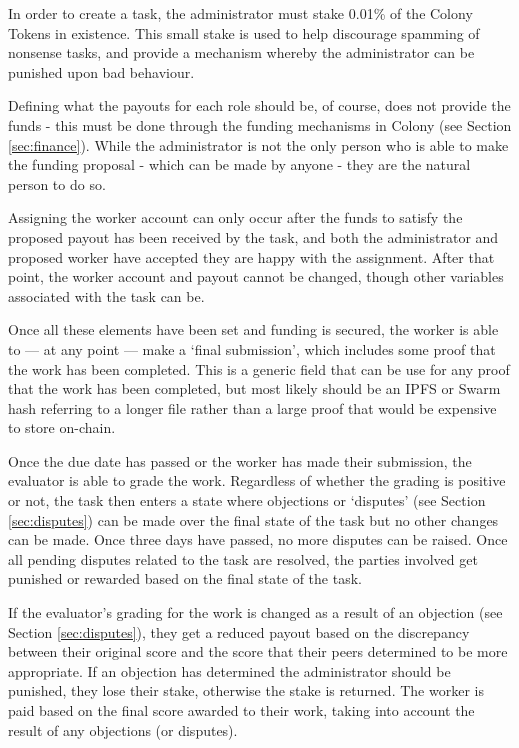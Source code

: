 In order to create a task, the administrator must stake 0.01\% of the Colony Tokens in existence. This small stake is used to help discourage spamming of nonsense tasks, and provide a mechanism whereby the administrator can be punished upon bad behaviour. 

Defining what the payouts for each role should be, of course, does not provide the funds - this must be done through the funding mechanisms in Colony (see Section \ref{sec:finance}). While the administrator is not the only person who is able to make the funding proposal - which can be made by anyone - they are the natural person to do so.

Assigning the worker account can only occur after the funds to satisfy the proposed payout has been received by the task, and both the administrator and proposed worker have accepted they are happy with the assignment. After that point, the worker account and payout cannot be changed, though other variables associated with the task can be.

Once all these elements have been set and funding is secured, the worker is able to --- at any point --- make a `final submission', which includes some proof that the work has been completed. This is a generic field that can be use for any proof that the work has been completed, but most likely should be an IPFS or Swarm hash referring to a longer file rather than a large proof that would be expensive to store on-chain.

Once the due date has passed or the worker has made their submission, the evaluator is able to grade the work. Regardless of whether the grading is positive or not, the task then enters a state where objections or `disputes' (see Section \ref{sec:disputes}) can be made over the final state of the task but no other changes can be made. Once three days have passed, no more disputes can be raised. Once all pending disputes related to the task are resolved, the parties involved get punished or rewarded based on the final state of the task.

If the evaluator's grading for the work is changed as a result of an objection (see Section \ref{sec:disputes}), they get a reduced payout based on the discrepancy between their original score and the score that their peers determined to be more appropriate. If an objection has determined the administrator should be punished, they lose their stake, otherwise the stake is returned. The worker is paid based on the final score awarded to their work, taking into account the result of any objections (or disputes).

